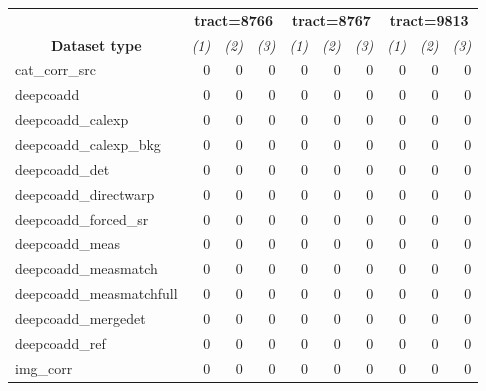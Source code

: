 \begin{table}
	\caption{
		Provenance verification. For each tract we count the number of: (1)
		missing direct association of files with the processing attempt, (2)
		missing \emph{was-generated-by} association (from Open Provenance
		Model) of a file with the pipeline code execution that produced it, and
		(3) times the \emph{was-generated-by} association does not belong to
		the specified processing attempt.
	}
	\label{tab:provenance}
	\small
	\begin{longtable}{lrrrrrrrrr}
		\hline\hline
		                                          &
		\multicolumn{3}{c}{\textbf{tract=8766}}   &
		\multicolumn{3}{c}{\textbf{tract=8767}}   &
		\multicolumn{3}{c}{\textbf{tract=9813}}   \\
		\multicolumn{1}{c}{\textbf{Dataset type}} &
		\multicolumn{1}{c}{\textit{(1)}} &
		\multicolumn{1}{c}{\textit{(2)}} &
		\multicolumn{1}{c}{\textit{(3)}} &
		\multicolumn{1}{c}{\textit{(1)}} &
		\multicolumn{1}{c}{\textit{(2)}} &
		\multicolumn{1}{c}{\textit{(3)}} &
		\multicolumn{1}{c}{\textit{(1)}} &
		\multicolumn{1}{c}{\textit{(2)}} &
		\multicolumn{1}{c}{\textit{(3)}} \\
		\hline\hline
		cat\_corr\_src           & 0 & 0 & 0 & 0 & 0 & 0 & 0 & 0 & 0 \\
		deepcoadd                & 0 & 0 & 0 & 0 & 0 & 0 & 0 & 0 & 0 \\
		deepcoadd\_calexp        & 0 & 0 & 0 & 0 & 0 & 0 & 0 & 0 & 0 \\
		deepcoadd\_calexp\_bkg   & 0 & 0 & 0 & 0 & 0 & 0 & 0 & 0 & 0 \\
		deepcoadd\_det           & 0 & 0 & 0 & 0 & 0 & 0 & 0 & 0 & 0 \\
		deepcoadd\_directwarp    & 0 & 0 & 0 & 0 & 0 & 0 & 0 & 0 & 0 \\
		deepcoadd\_forced\_sr    & 0 & 0 & 0 & 0 & 0 & 0 & 0 & 0 & 0 \\
		deepcoadd\_meas          & 0 & 0 & 0 & 0 & 0 & 0 & 0 & 0 & 0 \\
		deepcoadd\_measmatch     & 0 & 0 & 0 & 0 & 0 & 0 & 0 & 0 & 0 \\
		deepcoadd\_measmatchfull & 0 & 0 & 0 & 0 & 0 & 0 & 0 & 0 & 0 \\
		deepcoadd\_mergedet      & 0 & 0 & 0 & 0 & 0 & 0 & 0 & 0 & 0 \\
		deepcoadd\_ref           & 0 & 0 & 0 & 0 & 0 & 0 & 0 & 0 & 0 \\
		img\_corr                & 0 & 0 & 0 & 0 & 0 & 0 & 0 & 0 & 0 \\

\end{longtable}
\end{table}

